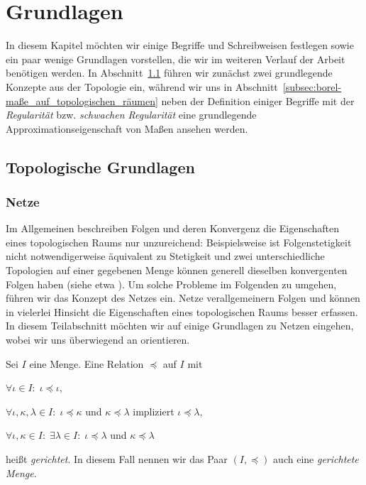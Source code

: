 \documentclass[../thesis/thesis.tex]{subfiles}
\begin{document}
	
	\chapter{Grundlagen}
	\label{chap:grundlagen}
	
	In diesem Kapitel möchten wir einige Begriffe und Schreibweisen festlegen sowie ein paar wenige Grundlagen vorstellen, 
	die wir im weiteren Verlauf der Arbeit benötigen werden. 
	In Abschnitt~\ref{subsec:topologische_grundlagen} führen wir zunächst zwei grundlegende Konzepte aus der Topologie ein, während wir
	uns in Abschnitt~\ref{subsec:borel-maße_auf_topologischen_räumen} neben der Definition einiger Begriffe mit der 
	\emph{Regularität} bzw. \emph{schwachen Regularität} eine grundlegende Approximationseigenschaft von Maßen ansehen werden.
	
	\section{Topologische Grundlagen}
	\label{subsec:topologische_grundlagen}
	
	\subsection*{Netze}
	
	Im Allgemeinen beschreiben Folgen und deren Konvergenz die Eigenschaften eines topologischen Raums nur unzureichend:
	Beispielsweise ist Folgenstetigkeit nicht notwendigerweise äquivalent zu Stetigkeit und zwei unterschiedliche Topologien auf einer 
	gegebenen Menge können generell dieselben konvergenten Folgen haben (siehe etwa \cite[Example 2.6.1]{Simon.2015}). 
	Um solche Probleme im Folgenden zu umgehen, führen wir das
	Konzept des Netzes ein. Netze verallgemeinern Folgen und können in vielerlei Hinsicht die 
	Eigenschaften eines topologischen Raums besser erfassen. In diesem Teilabschnitt möchten wir auf einige Grundlagen zu Netzen eingehen,
	wobei wir uns überwiegend an \cite[Section 2.6]{Simon.2015} orientieren.
	
	\begin{Definition}
		\label{def:gerichtete_menge}
		Sei $I$ eine Menge. Eine Relation $\preceq$ auf $I$ mit
		\begin{enumeratethm}
			\item $\forall \iota \in I: \; \iota \preceq \iota$,
			\item $\forall \iota, \kappa, \lambda \in I: \; \iota \preceq \kappa$ und $\kappa \preceq \lambda$ impliziert $\iota \preceq \lambda$,
			\item $\forall \iota, \kappa \in I: \; \exists \lambda \in I: \; \iota \preceq \lambda$ und $\kappa \preceq \lambda$
		\end{enumeratethm}
		heißt \emph{gerichtet}. In diesem Fall nennen wir das Paar $(I, \preceq)$ auch eine \emph{gerichtete Menge}.
	\end{Definition}
	
\end{document}
